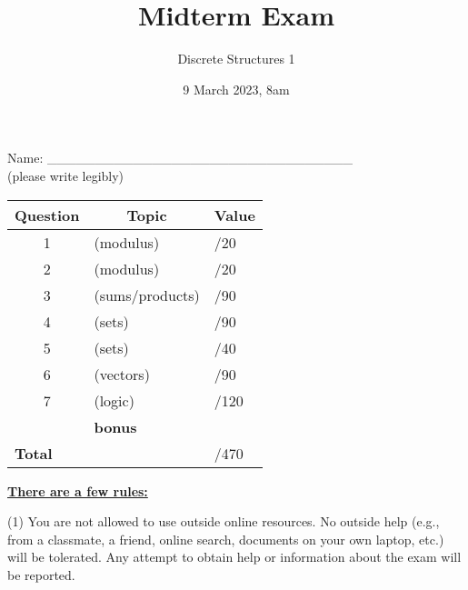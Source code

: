 \documentclass[11pt, oneside]{article}   	%
\title{Midterm Exam}
\author{Discrete Structures 1}
\date{9 March 2023, 8am}							%
\begin{document}
\maketitle
\begin{center}
Name: \_\_\_\_\_\_\_\_\_\_\_\_\_\_\_\_\_\_\_\_\_\_\_\_\_\_\_\_\_\_\_\_ \\(please write legibly) 
\end{center}

\begin{center}
\begin{tabular}{|c|l|l|}
\hline
\textbf{Question} & \multicolumn{1}{|c|}{\textbf{Topic}} & \multicolumn{1}{|c|}{\textbf{Value}}\\
\hline
\hline
1 & (modulus) & \hspace{3em}/20\\ \hline
2 & (modulus) & \hspace{3em}/20\\ \hline
3 & (sums/products) & \hspace{3em}/90\\ \hline
4 & (sets) & \hspace{3em}/90\\ \hline
5 & (sets) &  \hspace{3em}/40\\ \hline
6 & (vectors) & \hspace{3em}/90\\ \hline
7 & (logic) & \hspace{3em}/120\\ \hline
 & \textbf{bonus} &\\ \hline
 \hline
\hline
\multicolumn{2}{|l|}{\textbf{Total}} & \hspace{4em}/470\\
\hline
\end{tabular}
\end{center}


\textbf{\underline{There are a few rules:}}

(1) You are not allowed to use outside online resources. 
No outside help (e.g., from a classmate, a friend, online search, documents on your own laptop, etc.) will be tolerated. 
Any attempt to obtain help or information about the exam will be reported.
\end{document}
